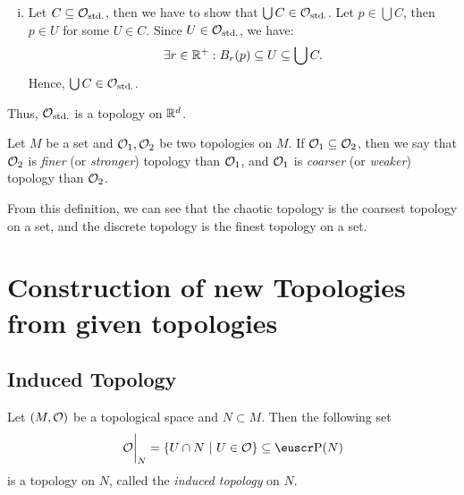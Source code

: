 \begin{example}
\begin{enumerate}[(i)]
		\item Let \(C \subseteq \mathcal{O}_{\text{std.}}\), then we have to show that \(\bigcup C\in\mathcal{O}_{\text{std.}}\). Let \(p \in \bigcup C\), then \(p \in U\) for some \(U \in C\). Since \(U \in \mathcal{O}_{\text{std.}}\), we have:
		      \begin{equation*}
			      \exists r \in \mathbb R^+ : B_r(p) \subseteq U \subseteq \bigcup C.
		      \end{equation*}
		      Hence, \(\bigcup C \in \mathcal{O}_{\text{std.}}\).
	\end{enumerate}
	Thus, \(\mathcal{O}_{\text{std.}}\) is a topology on \(\mathbb R^d\).
\end{example}

\begin{definition}
	Let \(M\) be a set and \(\mathcal{O}_1, \mathcal{O}_2\) be two topologies on \(M\). If \(\mathcal{O}_1 \subseteq \mathcal{O}_2\), then we say that \(\mathcal{O}_2\) is \emph{finer} (or \emph{stronger}) topology than \(\mathcal{O}_1\), and \(\mathcal{O}_1\) is \emph{coarser} (or \emph{weaker}) topology than \(\mathcal{O}_2\).
\end{definition}
From this definition, we can see that the chaotic topology is the coarsest topology on a set, and the discrete topology is the finest topology on a set.

\pagebreak
\section{Construction of new Topologies from given topologies}

\subsection{Induced Topology}
\begin{theorem}\label{thm:induced_topology}
	Let \((M, \mathcal{O})\) be a topological space and \(N \subset M\)\footnotemark. Then the following set
	\begin{equation}
		\eval{\O}_N = \qty{U \cap N \mid U \in \O} \subseteq \powerset(N) \label{eq:induced_topology}
	\end{equation}
	is a topology on \(N\), called the \emph{induced topology} on \(N\).
\end{theorem}

